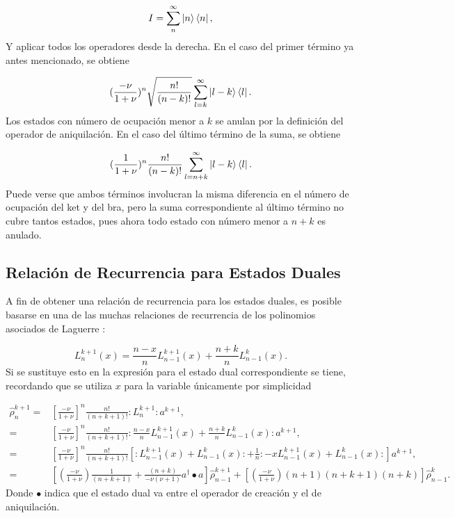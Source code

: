 \documentclass[a4paper,10pt]{report}
\begin{document}
\begin{equation}
I = \sum^\infty _n \Ket{n}\Bra{n},
\end{equation}Y aplicar todos los operadores desde la derecha. En el caso del primer término ya antes mencionado, se obtiene

\begin{equation}
 (\frac{-\nu}{1+\nu})^n \sqrt{\frac{n!}{(n-k)!}}\sum^\infty _{l=k} \Ket{l-k}\Bra{l}.
\end{equation} Los estados con número de ocupación menor a $k$ se anulan por la definición del operador de aniquilación. En el caso del último término de la suma, se obtiene

\begin{equation}
(\frac{1}{1+\nu})^n \frac{n!}{(n-k)!}\sum^\infty _{l=n+k} \Ket{l-k}\Bra{l}.
\end{equation} Puede verse que ambos términos involucran la misma diferencia en el número de ocupación del ket y del bra, pero la suma correspondiente al último término no cubre tantos estados, pues ahora todo estado con número menor a $n+k$ es anulado.

\subsection{Relación de Recurrencia para Estados Duales}

A fin de obtener una relación de recurrencia para los estados duales, es posible basarse en una de las muchas relaciones de recurrencia de los polinomios asociados de Laguerre \cite{ArfkenMM}:

\begin{equation}
L_n^{k+1}(x) = \frac{n-x}{n}L_{n-1}^{k+1}(x) + \frac{n+k}{n}L_{n-1}^{k}(x).
\end{equation} Si se sustituye esto en la expresión para el estado dual correspondiente se tiene, recordando que se utiliza $x$ para la variable únicamente por simplicidad

\begin{align}
\hat{\rho}_n ^{k+1} =& [\frac{-\nu}{1+\nu}]^n \frac{n!}{(n+k+1)!} :L_n^{k+1}:a^{k+1},\\
=&[\frac{-\nu}{1+\nu}]^n\frac{n!}{(n+k+1)!} :\frac{n-x}{n}L_{n-1}^{k+1}(x) + \frac{n+k}{n}L_{n-1}^{k}(x):a^{k+1},\\
=&[\frac{-\nu}{1+\nu}]^n\frac{n!}{(n+k+1)!}[:L_{n-1}^{k+1}(x)+L_{n-1}^{k}(x):+\frac{1}{n}:-xL_{n-1}^{k+1}(x)+L_{n-1}^{k}(x):]a^{k+1},\\
=&[(\frac{-\nu}{1+\nu})\frac{1}{(n+k+1)}+ \frac{(n+k)}{-\nu(\nu+1)}a^\dagger \bullet a]\hat{\rho}_{n-1} ^{k+1} + [(\frac{-\nu}{1+\nu}) (n+1)(n+k+1)(n+k)]\hat{\rho}_{n-1} ^{k}.
\end{align} Donde $\bullet$ indica que el estado dual va entre el operador de creación y el de aniquilación.
\end{document}
